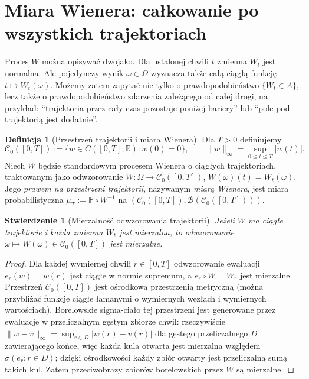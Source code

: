 \documentclass[11pt,a4paper,oneside]{report}
\numberwithin{equation}{chapter}
\theoremstyle{plain}
\newtheorem{stwierdzenie}[twierdzenie]{Stwierdzenie}
\theoremstyle{definition}
\newtheorem{definicja}{Definicja}[chapter]
\theoremstyle{remark}
\newcommand{\R}{\mathbb{R}}
\newcommand{\Prob}{\mathbb{P}}
\newcommand{\calB}{\mathcal{B}}
\newcommand{\calC}{\mathcal{C}}
\newcommand{\norm}[1]{\lVert #1\rVert}
\begin{document}
\section{Miara Wienera: całkowanie po wszystkich trajektoriach}
Proces $W$ można opisywać dwojako. Dla ustalonej chwili $t$
zmienna $W_t$ jest normalna. Ale pojedynczy wynik
$\omega\in\Omega$ wyznacza także całą ciągłą funkcję
$t\mapsto W_t(\omega)$. Możemy zatem zapytać nie tylko
o prawdopodobieństwo $\{W_t\in A\}$, lecz także o
prawdopodobieństwo zdarzenia zależącego od całej drogi,
na przykład: ``trajektoria przez cały czas pozostaje
poniżej bariery'' lub ``pole pod trajektorią jest dodatnie''.

\begin{definicja}[Przestrzeń trajektorii i miara Wienera]
Dla $T>0$ definiujemy
\[
\calC_0([0,T]):=\{w\in C([0,T];\R):w(0)=0\},
\qquad \norm{w}_\infty=\sup_{0\le t\le T}|w(t)|.
\]
Niech $W$ będzie standardowym procesem Wienera o ciągłych
trajektoriach, traktowanym jako odwzorowanie
$W:\Omega\to\calC_0([0,T])$,
$W(\omega)(t)=W_t(\omega)$.
Jego \emph{prawem na przestrzeni trajektorii}, nazywanym
\emph{miarą Wienera}, jest miara probabilistyczna
$\mu_T:=\Prob\circ W^{-1}$ na
$(\calC_0([0,T]),\calB(\calC_0([0,T])))$.
\end{definicja}

\begin{stwierdzenie}[Mierzalność odwzorowania trajektorii]
Jeżeli $W$ ma ciągłe trajektorie i każda zmienna $W_t$
jest mierzalna, to odwzorowanie
$\omega\mapsto W(\omega)\in\calC_0([0,T])$ jest mierzalne.
\end{stwierdzenie}
\begin{proof}
Dla każdej wymiernej chwili $r\in[0,T]$ odwzorowanie
ewaluacji $e_r(w)=w(r)$ jest ciągłe w normie supremum,
a $e_r\circ W=W_r$ jest mierzalne.
Przestrzeń $\calC_0([0,T])$ jest ośrodkową przestrzenią
metryczną (można przybliżać funkcje ciągłe łamanymi
o wymiernych węzłach i wymiernych wartościach).
Borelowskie sigma-ciało tej przestrzeni jest generowane
przez ewaluacje w przeliczalnym gęstym zbiorze chwil:
rzeczywiście $\norm{w-v}_\infty=\sup_{r\in D}|w(r)-v(r)|$
dla gęstego przeliczalnego $D$ zawierającego końce,
więc każda kula otwarta jest mierzalna względem
$\sigma(e_r:r\in D)$; dzięki ośrodkowości każdy zbiór
otwarty jest przeliczalną sumą takich kul.
Zatem przeciwobrazy zbiorów borelowskich przez $W$
są mierzalne.
\end{proof}
\end{document}
